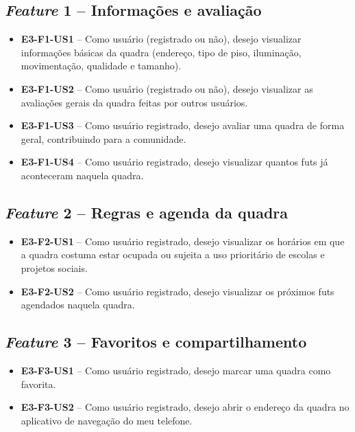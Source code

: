 \begin{apendicesenv}
    \subsection*{\textit{Feature} 1 -- Informações e avaliação}
    \begin{itemize}
        \item \textbf{E3-F1-US1} -- Como usuário (registrado ou não), desejo visualizar informações básicas da quadra (endereço, tipo de piso, iluminação, movimentação, qualidade e tamanho).
        \item \textbf{E3-F1-US2} -- Como usuário (registrado ou não), desejo visualizar as avaliações gerais da quadra feitas por outros usuários.
        \item \textbf{E3-F1-US3} -- Como usuário registrado, desejo avaliar uma quadra de forma geral, contribuindo para a comunidade.
        \item \textbf{E3-F1-US4} -- Como usuário registrado, desejo visualizar quantos futs já aconteceram naquela quadra.
    \end{itemize}

    \subsection*{\textit{Feature} 2 -- Regras e agenda da quadra}
    \begin{itemize}
        \item \textbf{E3-F2-US1} -- Como usuário registrado, desejo visualizar os horários em que a quadra costuma estar ocupada ou sujeita a uso prioritário de escolas e projetos sociais.
        \item \textbf{E3-F2-US2} -- Como usuário registrado, desejo visualizar os próximos futs agendados naquela quadra.
    \end{itemize}

    \subsection*{\textit{Feature} 3 -- Favoritos e compartilhamento}
    \begin{itemize}
        \item \textbf{E3-F3-US1} -- Como usuário registrado, desejo marcar uma quadra como favorita.
        \item \textbf{E3-F3-US2} -- Como usuário registrado, desejo abrir o endereço da quadra no aplicativo de navegação do meu telefone.
    \end{itemize}


\end{apendicesenv}

